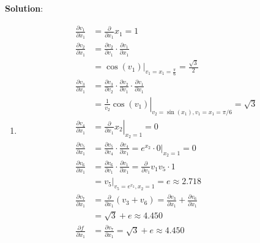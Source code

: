 \documentclass[submit]{../harvardml}
\newenvironment{answer}{
    \vspace{2mm}
    \color{blue}\noindent\textbf{Solution}:
}{}
\begin{document}
\begin{answer}
\begin{enumerate}
\begin{enumerate}
            \item
                  \begin{align*}
                    \frac{\partial v_1}{\partial x_1} & = \frac{\partial}{\partial x_1} x_1 = \boxed{1}\\
                    \frac{\partial v_2}{\partial x_1} & = \frac{\partial v_2}{\partial v_1}\cdot \frac{\partial v_1}{\partial x_1}\\
                    &=\cos(v_1)\rvert_{v_1=x_1=\frac{\pi}{6}}=\boxed{\frac{\sqrt{3}}{2}}\\
                    \frac{\partial v_3}{\partial x_1} & = \frac{\partial v_3}{\partial v_2}\cdot \frac{\partial v_2}{\partial v_1}\cdot \frac{\partial v_1}{\partial x_1}\\
                    &= \left. \frac{1}{v_2}\cos(v_1)\right|_{v_2=\sin(x_1),v_1=x_1=\pi/6} =\boxed{\sqrt{3}}\\
                    \frac{\partial v_4}{\partial x_1} & = \left. \frac{\partial}{\partial x_1} x_2 \right|_{x_2=1} = \boxed{0}\\
                    \frac{\partial v_5}{\partial x_1} & = \frac{\partial v_5}{\partial v_4} \cdot \frac{\partial v_4}{\partial x_1} = \left. e^{x_2}\cdot 0 \right|_{x_2=1}= \boxed{0}\\
                    \frac{\partial v_6}{\partial x_1} & = \frac{\partial v_6}{\partial v_1} \cdot \frac{\partial v_1}{\partial x_1} = \frac{\partial}{\partial v_1} v_1v_5 \cdot 1\\
                    &= v_5 \rvert_{v_5=e^{x_2},x_2=1} = \boxed{e \approx 2.718}\\
                    \frac{\partial v_7}{\partial x_1} & = \frac{\partial}{\partial x_1} (v_3 + v_6) = \frac{\partial v_3}{\partial x_1} + \frac{\partial v_6}{\partial x_1}\\
                    &= \boxed{\sqrt{3} + e \approx 4.450}\\
                    \frac{\partial f}{\partial x_1}   & = \frac{\partial v_7}{\partial x_1} = \boxed{\sqrt{3} + e \approx 4.450}
                  \end{align*}
          \end{enumerate}

  \end{enumerate}
\end{answer}


\newpage

\end{document}
